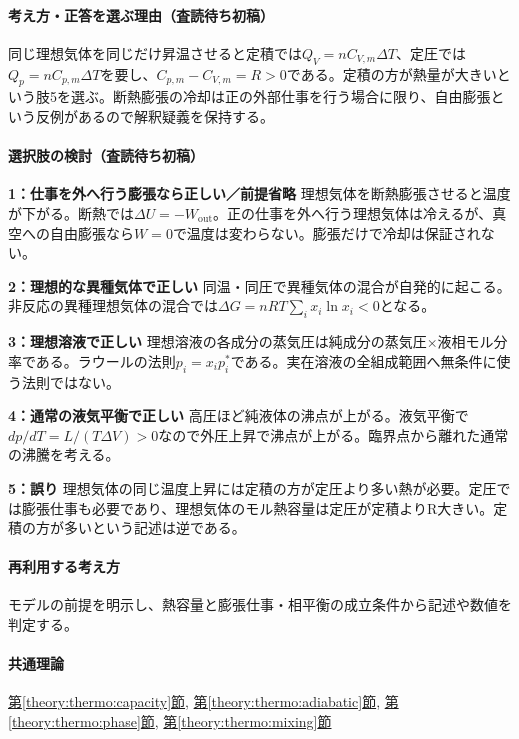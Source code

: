 \paragraph{考え方・正答を選ぶ理由（査読待ち初稿）} 同じ理想気体を同じだけ昇温させると定積では\(Q_V=nC_{V,m}\Delta T\)、定圧では\(Q_p=nC_{p,m}\Delta T\)を要し、\(C_{p,m}-C_{V,m}=R>0\)である。定積の方が熱量が大きいという肢5を選ぶ。断熱膨張の冷却は正の外部仕事を行う場合に限り、自由膨張という反例があるので解釈疑義を保持する。

\paragraph{選択肢の検討（査読待ち初稿）}\mbox{}\par

\noindent\textbf{1：仕事を外へ行う膨張なら正しい／前提省略} 理想気体を断熱膨張させると温度が下がる。断熱では\(\Delta U=-W_{\mathrm{out}}\)。正の仕事を外へ行う理想気体は冷えるが、真空への自由膨張なら\(W=0\)で温度は変わらない。膨張だけで冷却は保証されない。\par

\noindent\textbf{2：理想的な異種気体で正しい} 同温・同圧で異種気体の混合が自発的に起こる。非反応の異種理想気体の混合では\(\Delta G=nRT\sum_i x_i\ln x_i<0\)となる。\par

\noindent\textbf{3：理想溶液で正しい} 理想溶液の各成分の蒸気圧は純成分の蒸気圧×液相モル分率である。ラウールの法則\(p_i=x_i p_i^*\)である。実在溶液の全組成範囲へ無条件に使う法則ではない。\par

\noindent\textbf{4：通常の液気平衡で正しい} 高圧ほど純液体の沸点が上がる。液気平衡で\(dp/dT=L/(T\Delta V)>0\)なので外圧上昇で沸点が上がる。臨界点から離れた通常の沸騰を考える。\par

\noindent\textbf{5：誤り} 理想気体の同じ温度上昇には定積の方が定圧より多い熱が必要。定圧では膨張仕事も必要であり、理想気体のモル熱容量は定圧が定積よりR大きい。定積の方が多いという記述は逆である。\par

\paragraph{再利用する考え方} モデルの前提を明示し、熱容量と膨張仕事・相平衡の成立条件から記述や数値を判定する。

\paragraph{共通理論} \hyperref[theory:thermo:capacity]{第\ref*{theory:thermo:capacity}節}, \hyperref[theory:thermo:adiabatic]{第\ref*{theory:thermo:adiabatic}節}, \hyperref[theory:thermo:phase]{第\ref*{theory:thermo:phase}節}, \hyperref[theory:thermo:mixing]{第\ref*{theory:thermo:mixing}節}

